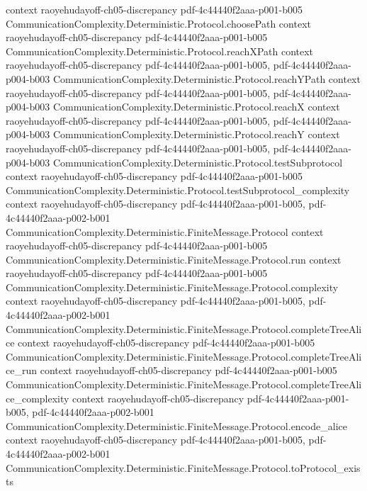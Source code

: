 \begin{lemma}
  {context}
  {raoyehudayoff-ch05-discrepancy}
  {pdf-4c44440f2aaa-p001-b005}
\proofstep
  {CommunicationComplexity.Deterministic.Protocol.choosePath}
  {context}
  {raoyehudayoff-ch05-discrepancy}
  {pdf-4c44440f2aaa-p001-b005}
\proofstep
  {CommunicationComplexity.Deterministic.Protocol.reachXPath}
  {context}
  {raoyehudayoff-ch05-discrepancy}
  {pdf-4c44440f2aaa-p001-b005,
    pdf-4c44440f2aaa-p004-b003}
\proofstep
  {CommunicationComplexity.Deterministic.Protocol.reachYPath}
  {context}
  {raoyehudayoff-ch05-discrepancy}
  {pdf-4c44440f2aaa-p001-b005,
    pdf-4c44440f2aaa-p004-b003}
\proofstep
  {CommunicationComplexity.Deterministic.Protocol.reachX}
  {context}
  {raoyehudayoff-ch05-discrepancy}
  {pdf-4c44440f2aaa-p001-b005,
    pdf-4c44440f2aaa-p004-b003}
\proofstep
  {CommunicationComplexity.Deterministic.Protocol.reachY}
  {context}
  {raoyehudayoff-ch05-discrepancy}
  {pdf-4c44440f2aaa-p001-b005,
    pdf-4c44440f2aaa-p004-b003}
\proofstep
  {CommunicationComplexity.Deterministic.Protocol.testSubprotocol}
  {context}
  {raoyehudayoff-ch05-discrepancy}
  {pdf-4c44440f2aaa-p001-b005}
\proofstep
  {CommunicationComplexity.Deterministic.Protocol.testSubprotocol_complexity}
  {context}
  {raoyehudayoff-ch05-discrepancy}
  {pdf-4c44440f2aaa-p001-b005,
    pdf-4c44440f2aaa-p002-b001}
\proofstep
  {CommunicationComplexity.Deterministic.FiniteMessage.Protocol}
  {context}
  {raoyehudayoff-ch05-discrepancy}
  {pdf-4c44440f2aaa-p001-b005}
\proofstep
  {CommunicationComplexity.Deterministic.FiniteMessage.Protocol.run}
  {context}
  {raoyehudayoff-ch05-discrepancy}
  {pdf-4c44440f2aaa-p001-b005}
\proofstep
  {CommunicationComplexity.Deterministic.FiniteMessage.Protocol.complexity}
  {context}
  {raoyehudayoff-ch05-discrepancy}
  {pdf-4c44440f2aaa-p001-b005,
    pdf-4c44440f2aaa-p002-b001}
\proofstep
  {CommunicationComplexity.Deterministic.FiniteMessage.Protocol.completeTreeAlice}
  {context}
  {raoyehudayoff-ch05-discrepancy}
  {pdf-4c44440f2aaa-p001-b005}
\proofstep
  {CommunicationComplexity.Deterministic.FiniteMessage.Protocol.completeTreeAlice_run}
  {context}
  {raoyehudayoff-ch05-discrepancy}
  {pdf-4c44440f2aaa-p001-b005}
\proofstep
  {CommunicationComplexity.Deterministic.FiniteMessage.Protocol.completeTreeAlice_complexity}
  {context}
  {raoyehudayoff-ch05-discrepancy}
  {pdf-4c44440f2aaa-p001-b005,
    pdf-4c44440f2aaa-p002-b001}
\proofstep
  {CommunicationComplexity.Deterministic.FiniteMessage.Protocol.encode_alice}
  {context}
  {raoyehudayoff-ch05-discrepancy}
  {pdf-4c44440f2aaa-p001-b005,
    pdf-4c44440f2aaa-p002-b001}
\proofstep
  {CommunicationComplexity.Deterministic.FiniteMessage.Protocol.toProtocol_exists}

\end{lemma}
